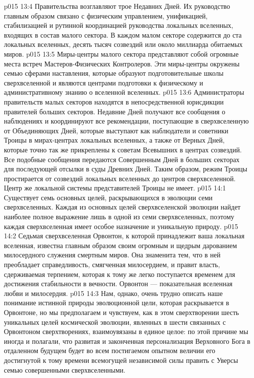 \vs p015 13:4 \pc Правительства  возглавляют трое Недавних Дней. Их руководство главным образом связано с физическим управлением, унификацией, стабилизацией и рутинной координацией руководства локальных вселенных, входящих в состав малого сектора. В каждом малом секторе содержится до ста локальных вселенных, десять тысяч созвездий или около миллиарда обитаемых миров.
\vs p015 13:5 Миры\hyp{}центры малого сектора представляют собой огромные места встреч Мастеров\hyp{}Физических Контролеров. Эти миры\hyp{}центры окружены семью сферами наставления, которые образуют подготовительные школы сверхвселенной и являются центрами подготовки к физическому и административному знанию о вселенной вселенных.
\vs p015 13:6 Администраторы правительств малых секторов находятся в непосредственной юрисдикции правителей больших секторов. Недавние Дней получают все сообщения о наблюдениях и координируют все рекомендации, поступающие в сверхвселенную от Объединяющих Дней, которые выступают как наблюдатели и советники Троицы в мирах\hyp{}центрах локальных вселенных, а также от Верных Дней, которые точно так же прикреплены к советам Всевышних в центрах созвездий. Все подобные сообщения передаются Совершенным Дней в больших секторах для последующей отсылки в суды Древних Дней. Таким образом, режим Троицы простирается от созвездий локальных вселенных до центров сверхвселенной. Центр же локальной системы представителей Троицы не имеет.
\vs p015 14:1 Существует семь основных целей, раскрывающихся в эволюции семи сверхвселенных. Каждая из основных целей сверхвселенской эволюции найдет наиболее полное выражение лишь в одной из семи сверхвселенных, поэтому каждая сверхвселенная имеет особое назначение и уникальную природу.
\vs p015 14:2 Седьмая сверхвселенная Орвонтон, к которой принадлежит ваша локальная вселенная, известна главным образом своим огромным и щедрым дарованием милосердного служения смертным миров. Она знаменита тем, что в ней преобладает справедливость, смягченная милосердием, и правит власть, сдерживаемая терпением, которая к тому же легко поступается временем для достижения стабильности в вечности. Орвонтон --- показательная вселенная любви и милосердия.
\vs p015 14:3 Нам, однако, очень трудно описать наше понимание истинной природы эволюционной цели, которая раскрывается в Орвонтоне, но мы предполагаем и чувствуем, как в этом сверхтворении шесть уникальных целей космической эволюции, явленных в шести связанных с Орвонтоном сверхтворениях, взаимоувязаны в единое целое: по этой причине мы иногда и полагали, что развитая и законченная персонализация Верховного Бога в отдаленном будущем будет во всем постигаемом опытном величии его достигнутой к тому времени всемогущей независимой силы править с Уверсы семью совершенными сверхвселенными.
